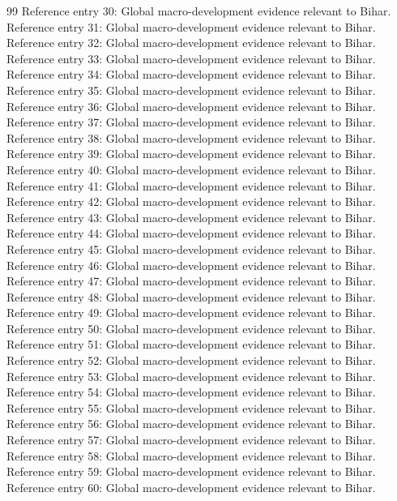 \documentclass[preprint,12pt]{elsarticle}
\begin{document}
\begin{thebibliography}{99}
\bibitem{} Reference entry 30: Global macro-development evidence relevant to Bihar.
\bibitem{} Reference entry 31: Global macro-development evidence relevant to Bihar.
\bibitem{} Reference entry 32: Global macro-development evidence relevant to Bihar.
\bibitem{} Reference entry 33: Global macro-development evidence relevant to Bihar.
\bibitem{} Reference entry 34: Global macro-development evidence relevant to Bihar.
\bibitem{} Reference entry 35: Global macro-development evidence relevant to Bihar.
\bibitem{} Reference entry 36: Global macro-development evidence relevant to Bihar.
\bibitem{} Reference entry 37: Global macro-development evidence relevant to Bihar.
\bibitem{} Reference entry 38: Global macro-development evidence relevant to Bihar.
\bibitem{} Reference entry 39: Global macro-development evidence relevant to Bihar.
\bibitem{} Reference entry 40: Global macro-development evidence relevant to Bihar.
\bibitem{} Reference entry 41: Global macro-development evidence relevant to Bihar.
\bibitem{} Reference entry 42: Global macro-development evidence relevant to Bihar.
\bibitem{} Reference entry 43: Global macro-development evidence relevant to Bihar.
\bibitem{} Reference entry 44: Global macro-development evidence relevant to Bihar.
\bibitem{} Reference entry 45: Global macro-development evidence relevant to Bihar.
\bibitem{} Reference entry 46: Global macro-development evidence relevant to Bihar.
\bibitem{} Reference entry 47: Global macro-development evidence relevant to Bihar.
\bibitem{} Reference entry 48: Global macro-development evidence relevant to Bihar.
\bibitem{} Reference entry 49: Global macro-development evidence relevant to Bihar.
\bibitem{} Reference entry 50: Global macro-development evidence relevant to Bihar.
\bibitem{} Reference entry 51: Global macro-development evidence relevant to Bihar.
\bibitem{} Reference entry 52: Global macro-development evidence relevant to Bihar.
\bibitem{} Reference entry 53: Global macro-development evidence relevant to Bihar.
\bibitem{} Reference entry 54: Global macro-development evidence relevant to Bihar.
\bibitem{} Reference entry 55: Global macro-development evidence relevant to Bihar.
\bibitem{} Reference entry 56: Global macro-development evidence relevant to Bihar.
\bibitem{} Reference entry 57: Global macro-development evidence relevant to Bihar.
\bibitem{} Reference entry 58: Global macro-development evidence relevant to Bihar.
\bibitem{} Reference entry 59: Global macro-development evidence relevant to Bihar.
\bibitem{} Reference entry 60: Global macro-development evidence relevant to Bihar.

\end{thebibliography}
\end{document}
